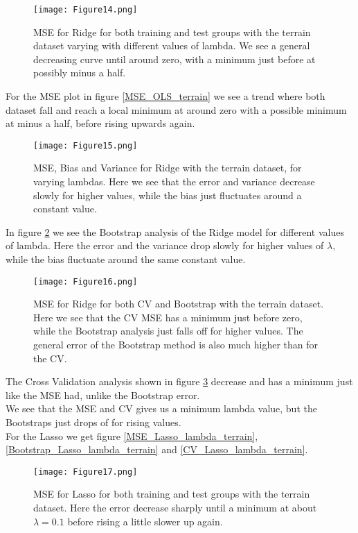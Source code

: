 \documentclass[11pt, A4paper, english]{article}
\begin{document}
\begin{multicols}{2}
			\begin{figure}[H]
\texttt{[image: Figure14.png]}
\caption{MSE for Ridge for both training and test groups with the terrain dataset varying with different values of lambda. We see a general decreasing curve until around zero, with a minimum just before at possibly minus a half.}
\label{MSE_Ridge_lambda_terrain}
			\end{figure}
For the MSE plot in figure \ref{MSE_OLS_terrain} we see a trend where both dataset fall and reach a local minimum at around zero with a possible minimum at minus a half, before rising upwards again.
			\begin{figure}[H]
\texttt{[image: Figure15.png]}
\caption{MSE, Bias and Variance for Ridge with the terrain dataset, for varying lambdas. Here we see that the error and variance decrease slowly for higher values, while the bias just fluctuates around a constant value.}
\label{Bootstrap_Ridge_lambda_terrain}
			\end{figure}
In figure \ref{Bootstrap_Ridge_lambda_terrain} we see the Bootstrap analysis of the Ridge model for different values of lambda. Here the error and the variance drop slowly for higher values of $\lambda$, while the bias fluctuate around the same constant value.
			\begin{figure}[H]
\texttt{[image: Figure16.png]}
\caption{MSE for Ridge for both CV and Bootstrap with the terrain dataset. Here we see that the CV MSE has a minimum just before zero, while the Bootstrap analysis just falls off for higher values. The general error of the Bootstrap method is also much higher than for the CV.}
\label{CV_Ridge_lambda_terrain}
			\end{figure}
The Cross Validation analysis shown in figure \ref{CV_Ridge_lambda_terrain} decrease and has a minimum just like the MSE had, unlike the Bootstrap error. \\
We see that the MSE and CV gives us a minimum lambda value, but the Bootstraps just drops of for rising values. \\
For the Lasso we get figure \ref{MSE_Lasso_lambda_terrain}, \ref{Bootstrap_Lasso_lambda_terrain} and \ref{CV_Lasso_lambda_terrain}.
			\begin{figure}[H]
\texttt{[image: Figure17.png]}
\caption{MSE for Lasso for both training and test groups with the terrain dataset. Here the error decrease sharply until a minimum at about $\lambda = 0.1$ before rising a little slower up again.}

\end{figure}
\end{multicols}
\end{document}
